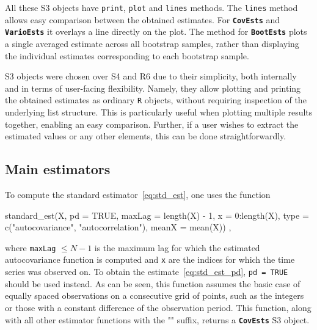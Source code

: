 All these S3 objects have \texttt{print}, \texttt{plot} and \texttt{lines} methods. The \texttt{lines} method allows easy comparison between the obtained estimates. For \textbf{\texttt{CovEsts}} and \textbf{\texttt{VarioEsts}} it overlays a line directly on the plot. The  method for \textbf{\texttt{BootEsts}} plots a single averaged estimate across all bootstrap samples, rather than displaying the individual estimates corresponding to each bootstrap sample.

S3 objects were chosen over S4 and R6 due to their simplicity, both internally and in terms of user-facing flexibility. Namely, they allow plotting and printing the obtained estimates as ordinary \texttt{R} objects, without requiring inspection of the underlying list structure. This is particularly useful when plotting multiple results together, enabling an easy comparison. Further, if a user wishes to extract the estimated values or any other elements, this can be done straightforwardly.

\subsection{Main estimators}
To compute the standard estimator~\eqref{eq:std_est}, one uses the function
\begin{example}
standard_est(X, pd = TRUE, maxLag = length(X) - 1, x = 0:length(X),
        type = c("autocovariance", "autocorrelation"), meanX = mean(X)) ,
\end{example}
where \texttt{maxLag} \(\leq N - 1\) is the maximum lag for which the estimated autocovariance function is computed and \texttt{x} are the indices for which the time series was observed on. To obtain the estimate~\eqref{eq:std_est_pd}, \texttt{pd = TRUE} should be used instead.
As can be seen, this function assumes the basic case of equally spaced observations on a consecutive grid of points, such as the integers or those with a constant difference of the observation period.
This function, along with all other estimator functions with the "" suffix, returns a \textbf{\texttt{CovEsts}} S3 object.

